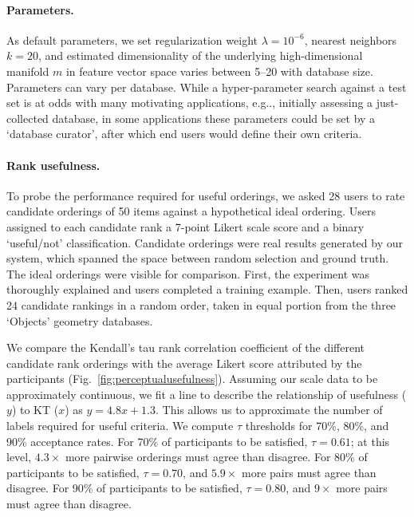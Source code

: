 \documentclass{article}
\makeatletter
\DeclareRobustCommand\onedot{\futurelet\@let@token\@onedot}
\def\@onedot{\ifx\@let@token.\else.\null\fi\xspace}
\def\eg{{e.g}\onedot} \def\Eg{{E.g}\onedot}
\makeatother
\begin{document}
\paragraph{Parameters.}
As default parameters, we set regularization weight $\lambda=10^{-6}$, nearest neighbors $k=20$, and estimated dimensionality of the underlying high-dimensional manifold $m$ in feature vector space varies between 5--20 with database size. Parameters can vary per database. While a hyper-parameter search against a test set is at odds with many motivating applications, \eg, initially assessing a just-collected database, in some applications these parameters could be set by a `database curator', after which end users would define their own criteria. 

\begin{figure}[t]
    \centering
\end{figure}

\paragraph{Rank usefulness.}
To probe the performance required for useful orderings, we asked 28 users to rate candidate orderings of 50 items against a hypothetical ideal ordering. Users assigned to each candidate rank a 7-point Likert scale score and a binary `useful/not' classification. Candidate orderings were real results generated by our system, which spanned the space between random selection and ground truth. The ideal orderings were visible for comparison. First, the experiment was thoroughly explained and users completed a training example. Then, users ranked 24 candidate rankings in a random order, taken in equal portion from the three `Objects' geometry databases.

We compare the Kendall's tau rank correlation coefficient of the different candidate rank orderings with the average Likert score attributed by the participants (Fig.~\ref{fig:perceptualusefulness}). Assuming our scale data to be approximately continuous, we fit a line to describe the relationship of usefulness ($y$) to KT ($x$) as $y=4.8x + 1.3$. This allows us to approximate the number of labels required for useful criteria. We compute $\tau$ thresholds for 70\%, 80\%, and 90\% acceptance rates. For 70\% of participants to be satisfied, $\tau=0.61$; at this level, $4.3\times$ more pairwise orderings must agree than disagree. For 80\% of participants to be satisfied, $\tau=0.70$, and $5.9\times$ more pairs must agree than disagree. For 90\% of participants to be satisfied, $\tau=0.80$, and $9\times$ more pairs must agree than disagree.
\end{document}
